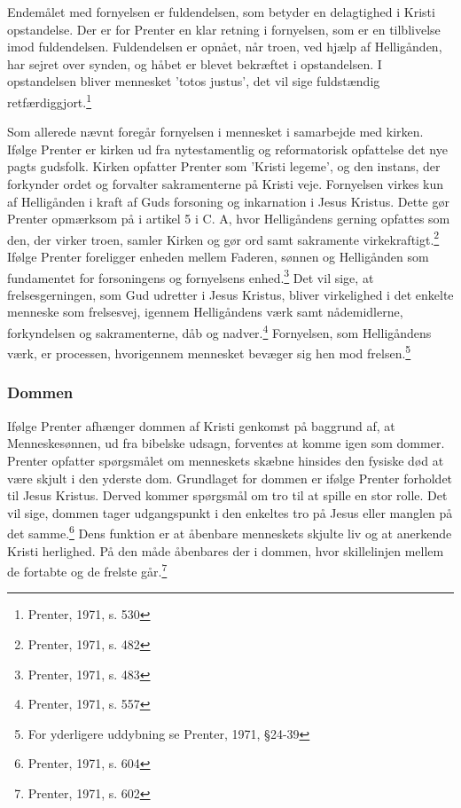 Endemålet med fornyelsen er fuldendelsen, som betyder en delagtighed i Kristi opstandelse. Der er for Prenter en klar retning i fornyelsen, som er en tilblivelse imod fuldendelsen. Fuldendelsen er opnået, når troen, ved hjælp af Helligånden, har sejret over synden, og håbet er blevet bekræftet i opstandelsen. I opstandelsen bliver mennesket 'totos justus', det vil sige fuldstændig retfærdiggjort.\footnote{Prenter, 1971, s. 530}

Som allerede nævnt foregår fornyelsen i mennesket i samarbejde med kirken. Ifølge Prenter er kirken ud fra nytestamentlig og reformatorisk opfattelse det nye pagts gudsfolk. Kirken opfatter Prenter som 'Kristi legeme', og den instans, der forkynder ordet og forvalter sakramenterne på Kristi veje. Fornyelsen virkes kun af Helligånden i kraft af Guds forsoning og inkarnation i Jesus Kristus. Dette gør Prenter opmærksom på i artikel 5 i C. A, hvor Helligåndens gerning opfattes som den, der virker troen, samler Kirken og gør ord samt sakramente virkekraftigt.\footnote{Prenter, 1971, s. 482} Ifølge Prenter foreligger enheden mellem Faderen, sønnen og Helligånden som fundamentet for forsoningens og fornyelsens enhed.\footnote{Prenter, 1971, s. 483} Det vil sige, at frelsesgerningen, som Gud udretter i Jesus Kristus, bliver virkelighed i det enkelte menneske som frelsesvej, igennem Helligåndens værk samt nådemidlerne, forkyndelsen og sakramenterne, dåb og nadver.\footnote{Prenter, 1971, s. 557} Fornyelsen, som Helligåndens værk, er processen, hvorigennem mennesket bevæger sig hen mod frelsen.\footnote{For yderligere uddybning se Prenter, 1971, §24-39}

\subsubsection{Dommen}
Ifølge Prenter afhænger dommen af Kristi genkomst på baggrund af, at Menneskesønnen, ud fra bibelske
udsagn, forventes at komme igen som dommer. Prenter opfatter spørgsmålet om menneskets skæbne hinsides
den fysiske død at være skjult i den yderste dom. Grundlaget for dommen er ifølge Prenter forholdet til
Jesus Kristus. Derved kommer spørgsmål om tro til at spille en stor rolle. Det vil sige, dommen tager udgangspunkt i den enkeltes tro på Jesus eller manglen på det samme.\footnote{Prenter, 1971, s. 604} Dens funktion er at åbenbare menneskets skjulte liv og at anerkende Kristi herlighed. På den måde åbenbares der i dommen, hvor skillelinjen mellem de fortabte og de frelste går.\footnote{Prenter, 1971, s. 602}

